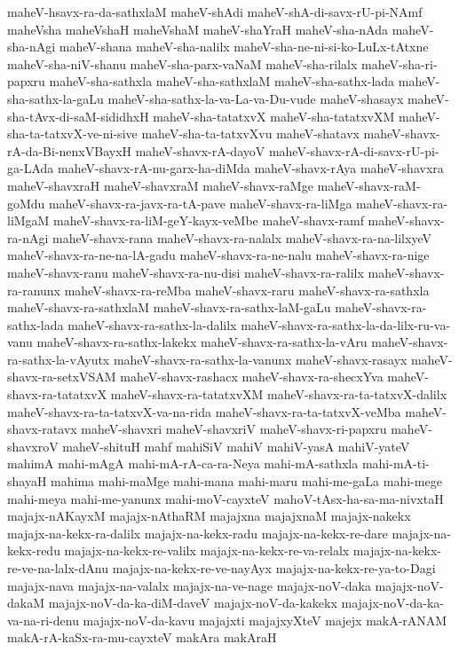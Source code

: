 {maheV-hsavx-ra-da-sathxlaM
maheV-shAdi
maheV-shA-di-savx-rU-pi-NAmf
maheVsha
maheVshaH
maheVshaM
maheV-shaYraH
maheV-sha-nAda
maheV-sha-nAgi
maheV-shana
maheV-sha-nalilx
maheV-sha-ne-ni-si-ko-LuLx-tAtxne
maheV-sha-niV-shanu
maheV-sha-parx-vaNaM
maheV-sha-rilalx
maheV-sha-ri-papxru
maheV-sha-sathxla
maheV-sha-sathxlaM
maheV-sha-sathx-lada
maheV-sha-sathx-la-gaLu
maheV-sha-sathx-la-va-La-va-Du-vude
maheV-shasayx
maheV-sha-tAvx-di-saM-sididhxH
maheV-sha-tatatxvX
maheV-sha-tatatxvXM
maheV-sha-ta-tatxvX-ve-ni-sive
maheV-sha-ta-tatxvXvu
maheV-shatavx
maheV-shavx-rA-da-Bi-nenxVBayxH
maheV-shavx-rA-dayoV
maheV-shavx-rA-di-savx-rU-pi-ga-LAda
maheV-shavx-rA-nu-garx-ha-diMda
maheV-shavx-rAya
maheV-shavxra
maheV-shavxraH
maheV-shavxraM
maheV-shavx-raMge
maheV-shavx-raM-goMdu
maheV-shavx-ra-javx-ra-tA-pave
maheV-shavx-ra-liMga
maheV-shavx-ra-liMgaM
maheV-shavx-ra-liM-geY-kayx-veMbe
maheV-shavx-ramf
maheV-shavx-ra-nAgi
maheV-shavx-rana
maheV-shavx-ra-nalalx
maheV-shavx-ra-na-lilxyeV
maheV-shavx-ra-ne-na-lA-gadu
maheV-shavx-ra-ne-nalu
maheV-shavx-ra-nige
maheV-shavx-ranu
maheV-shavx-ra-nu-disi
maheV-shavx-ra-ralilx
maheV-shavx-ra-ranunx
maheV-shavx-ra-reMba
maheV-shavx-raru
maheV-shavx-ra-sathxla
maheV-shavx-ra-sathxlaM
maheV-shavx-ra-sathx-laM-gaLu
maheV-shavx-ra-sathx-lada
maheV-shavx-ra-sathx-la-dalilx
maheV-shavx-ra-sathx-la-da-lilx-ru-va-vanu
maheV-shavx-ra-sathx-lakekx
maheV-shavx-ra-sathx-la-vAru
maheV-shavx-ra-sathx-la-vAyutx
maheV-shavx-ra-sathx-la-vanunx
maheV-shavx-rasayx
maheV-shavx-ra-setxVSAM
maheV-shavx-rashacx
maheV-shavx-ra-shecxYva
maheV-shavx-ra-tatatxvX
maheV-shavx-ra-tatatxvXM
maheV-shavx-ra-ta-tatxvX-dalilx
maheV-shavx-ra-ta-tatxvX-va-na-rida
maheV-shavx-ra-ta-tatxvX-veMba
maheV-shavx-ratavx
maheV-shavxri
maheV-shavxriV
maheV-shavx-ri-papxru
maheV-shavxroV
maheV-shituH
mahf
mahiSiV
mahiV
mahiV-yasA
mahiV-yateV
mahimA
mahi-mAgA
mahi-mA-rA-ca-ra-Neya
mahi-mA-sathxla
mahi-mA-ti-shayaH
mahima
mahi-maMge
mahi-mana
mahi-maru
mahi-me-gaLa
mahi-mege
mahi-meya
mahi-me-yanunx
mahi-moV-cayxteV
mahoV-tAsx-ha-sa-ma-nivxtaH
majajx-nAKayxM
majajx-nAthaRM
majajxna
majajxnaM
majajx-nakekx
majajx-na-kekx-ra-dalilx
majajx-na-kekx-radu
majajx-na-kekx-re-dare
majajx-na-kekx-redu
majajx-na-kekx-re-valilx
majajx-na-kekx-re-va-relalx
majajx-na-kekx-re-ve-na-lalx-dAnu
majajx-na-kekx-re-ve-nayAyx
majajx-na-kekx-re-ya-to-Dagi
majajx-nava
majajx-na-valalx
majajx-na-ve-nage
majajx-noV-daka
majajx-noV-dakaM
majajx-noV-da-ka-diM-daveV
majajx-noV-da-kakekx
majajx-noV-da-ka-va-na-ri-denu
majajx-noV-da-kavu
majajxti
majajxyXteV
majejx
makA-rANAM
makA-rA-kaSx-ra-mu-cayxteV
makAra
makAraH
}
